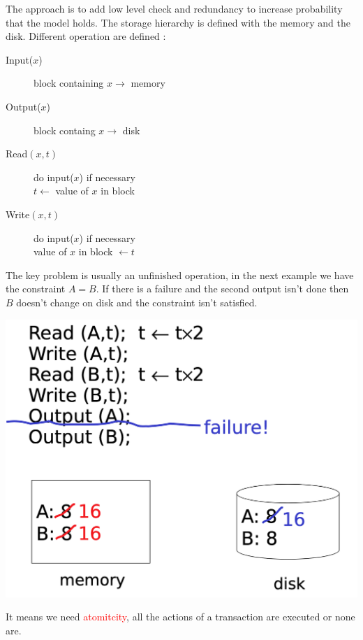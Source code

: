 \documentclass[12pt,a4paper]{article}
\begin{document}
The approach is to add low level check and redundancy to increase probability that the model holds. The storage hierarchy is defined with the memory and the disk. Different operation are defined :
\begin{description}
\item[Input($x$)] block containing $x \rightarrow$ memory
\item[Output($x$)] block containg $x \rightarrow$ disk
\item[Read$(x,t)$] do input($x$) if necessary \\ $t \leftarrow$ value of $x$ in block
\item[Write$(x,t)$] do input($x$) if necessary \\ value of $x$ in block $\leftarrow t$
\end{description}

The key problem is usually an unfinished operation, in the next example we have the constraint $A = B$. If there is a failure and the second output isn't done then $B$ doesn't change on disk and the constraint isn't satisfied.
\begin{center}
\includegraphics[scale=0.2]{img/img61.png}
\end{center}
It means we need \textcolor{red}{atomitcity}, all the actions of a transaction are executed or none are.
\end{document}
